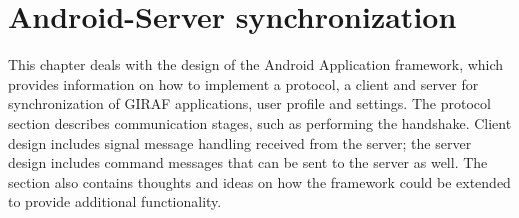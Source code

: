 \chapter{Android-Server synchronization}
\label{androidDesign}
This chapter deals with the design of the Android Application framework, which provides information on how to implement a protocol, a client and server for synchronization of GIRAF applications, user profile and settings.
The protocol section describes communication stages, such as performing the handshake. Client design includes signal message handling received from the server; the server design includes command messages that can be sent to the server as well. 
The section also contains thoughts and ideas on how the framework could be extended to provide additional functionality. 
